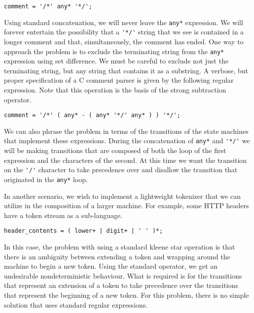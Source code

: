 \documentclass[letterpaper,11pt,oneside]{book}
\newcommand{\verbspace}{\vspace{10pt}}
\begin{document}
\verbspace
\begin{verbatim}
comment = '/*' any* '*/';
\end{verbatim}
\verbspace

Using standard concatenation, we will never leave the \verb|any*| expression.
We will forever entertain the possibility that a \verb|'*/'| string that we see
is contained in a longer comment and that, simultaneously, the comment has
ended. One way to approach the problem is to exclude the terminating string
from the \verb|any*| expression using set difference. We must be careful to
exclude not just the terminating string, but any string that contains it as a
substring. A verbose, but proper specification of a C comment parser is given
by the following regular expression. Note that this operation is the basis of the
strong subtraction operator.

\verbspace
\begin{verbatim}
comment = '/*' ( any* - ( any* '*/' any* ) ) '*/';
\end{verbatim}
\verbspace

We can also phrase the problem in terms of the transitions of the state
machines that implement these expressions. During the concatenation of
\verb|any*| and \verb|'*/'| we will be making transitions that are composed of
both the loop of the first expression and the characters of the second.
At this time we want the transition on the \verb|'/'| character to take precedence
over and disallow the transition that originated in the \verb|any*| loop.

In another scenario, we wish to implement a lightweight tokenizer that we can
utilize in the composition of a larger machine. For example, some HTTP headers
have a token stream as a sub-language.

\verbspace
\begin{verbatim}
header_contents = ( lower+ | digit+ | ' ' )*;
\end{verbatim}
\verbspace

In this case, the problem with using a standard kleene star operation is that
there is an ambiguity between extending a token and wrapping around the
machine to begin a new token. Using the standard operator, we get
an undesirable nondeterministic behaviour. What is required is for the
transitions that represent an extension of a token to take precedence over the
transitions that represent the beginning of a new token. For this problem,
there is no simple solution that uses standard regular expressions.
\end{document}
